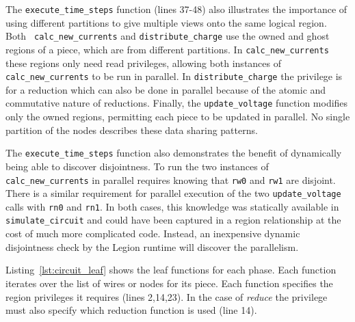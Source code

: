 The {\tt execute\_time\_steps} function (lines 37-48)  
also illustrates the importance of using different partitions to give
multiple views onto the same logical region.  Both {\tt
  calc\_new\_currents} and {\tt distribute\_charge} 
use the owned and ghost regions of a piece, which are from different partitions. In
{\tt calc\_new\_currents} these regions only need read
privileges, allowing both instances of {\tt calc\_new\_currents} to be
run in parallel.  In {\tt distribute\_charge} the
privilege is for a reduction which can also be done in parallel
because of the atomic and commutative nature of reductions.  Finally,
the {\tt update\_voltage} function modifies only the owned regions, permitting
each piece to be updated in parallel.  No
single partition of the nodes
describes these data sharing patterns.

The {\tt execute\_time\_steps} function also demonstrates the benefit of dynamically
being able to discover disjointness.  To run the two instances of 
{\tt calc\_new\_currents} in parallel requires knowing that {\tt rw0}
and {\tt rw1} are disjoint.  There is a similar requirement for parallel
execution of the two {\tt update\_voltage} calls with {\tt rn0} and {\tt rn1}.  In
both cases, this knowledge was statically available in {\tt simulate\_circuit}
and could have been captured in a region relationship at the cost
of much more complicated code.  Instead, an inexpensive dynamic disjointness
check by the Legion runtime will discover the parallelism.

Listing~\ref{lst:circuit_leaf} shows the leaf functions for each phase.
Each function iterates over the list of wires or
nodes for its piece.  Each function specifies the region privileges it
requires (lines 2,14,23).  
In the case of {\em reduce} the
privilege must also specify which reduction function is used
(line 14).

